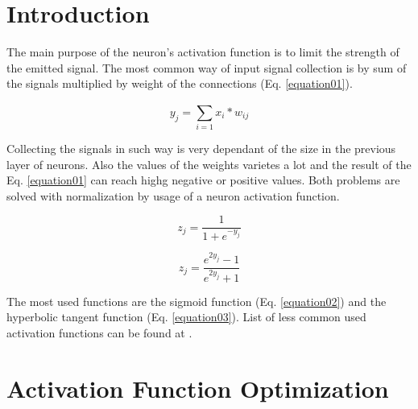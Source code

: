 \documentclass{llncs}
\begin{document}

\section{Introduction}

The main purpose of the neuron's activation function is to limit the strength of the emitted signal. The most common way of input signal collection is by sum of the signals multiplied by weight of the connections (Eq. \ref{equation01}).

\begin{equation}
\label{equation01}
y_{j} = \sum_{i=1}^{} x_{i}*w_{ij}
\end{equation}

Collecting the signals in such way is very dependant of the size in the previous layer of neurons. Also the values of the weights varietes a lot and the result of the Eq. \ref{equation01} can reach highg negative or positive values. Both problems are solved with normalization by usage of a neuron activation function. 

\begin{equation}
\label{equation02}
z_{j} = \frac{1}{1 + e^{-y_{j}}}
\end{equation}

\begin{equation}
\label{equation03}
z_{j} = \frac{e^{2y_{j}}-1}{e^{2y_{j}}+1}
\end{equation}


The most used functions are the sigmoid function (Eq. \ref{equation02}) and the hyperbolic tangent function (Eq. \ref{equation03}). List of less common used activation functions can be found at \cite{wikipedia01}.

\section{Activation Function Optimization}
\end{document}

